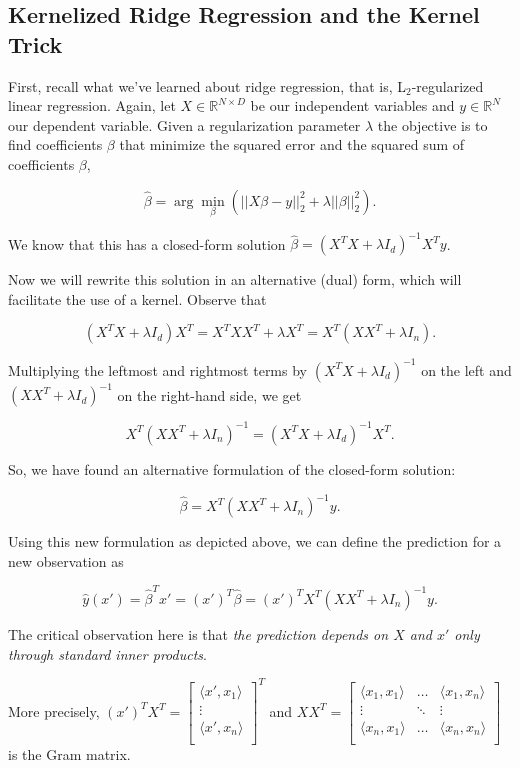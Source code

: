 \begin{refsection}
\subsection*{Kernelized Ridge Regression and the Kernel Trick}

First, recall what we've learned about ridge regression, that is, L$_2$-regularized linear regression. Again, let $X \in \mathbb{R}^{N \times D}$ be our independent variables and $y \in \mathbb{R}^N$ our dependent variable. Given a regularization parameter $\lambda$ the objective is to find coefficients $\beta$ that minimize the squared error and the squared sum of coefficients $\beta$,

$$\hat{\beta} = \arg \min_\beta \left(\lvert\lvert X\beta - y  \rvert\rvert_2^2  + \lambda \lvert\lvert \beta  \rvert\rvert_2^2\right).$$

We know that this has a closed-form solution $\hat{\beta} = (X^TX + \lambda I_d)^{-1}X^Ty$.

Now we will rewrite this solution in an alternative (dual) form, which will facilitate the use of a kernel. Observe that

$$(X^TX + \lambda I_d)X^T = X^TXX^T + \lambda X^T = X^T(XX^T + \lambda I_n).$$

Multiplying the leftmost and rightmost terms by $(X^TX + \lambda I_d)^{-1}$ on the left and $(XX^T + \lambda I_d)^{-1}$ on the right-hand side, we get

$$X^T(XX^T + \lambda I_n)^{-1} = (X^TX + \lambda I_d)^{-1}X^T.$$

So, we have found an alternative formulation of the closed-form solution:

$$\hat{\beta} = X^T(XX^T + \lambda I_n)^{-1}y.$$

Using this new formulation as depicted above, we can define the prediction for a new observation as

$$\hat{y}(x') = \hat{\beta}^Tx' = (x')^T\hat{\beta} = (x')^T X^T(XX^T + \lambda I_n)^{-1}y.$$

The critical observation here is that {\em the prediction depends on $X$ and $x'$ only through standard inner products}.

More precisely, $(x')^T X^T = \begin{bmatrix} 
\langle x',x_1 \rangle \\
 \vdots \\ 
\langle x',x_n \rangle  \\  \end{bmatrix}^T $ and $XX^T =  \begin{bmatrix} 
\langle x_1,x_1 \rangle & \hdots & \langle x_1,x_n \rangle \\
 \vdots & \ddots & \vdots \\ 
  \langle x_n,x_1 \rangle & \hdots & \langle x_n,x_n \rangle \\  \end{bmatrix} $ is the Gram matrix.


\end{refsection}
